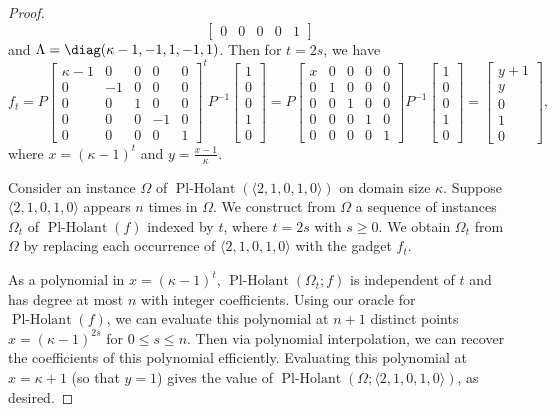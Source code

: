\documentclass[11pt]{article}
\newcommand{\PlHolant}{\operatorname{Pl-Holant}}
\begin{document}
\begin{proof}
\[\begin{bmatrix}
   0 &          0 & 0 &  0 & 1
  \end{bmatrix}
 \]
 and $\Lambda = \diag(\kappa - 1, -1, 1, -1, 1)$.
 Then for $t = 2 s$, we have
 \[
  f_t
  =
  P
  \begin{bmatrix}
   \kappa - 1 &  0 & 0 &  0 & 0 \\
            0 & -1 & 0 &  0 & 0 \\
            0 &  0 & 1 &  0 & 0 \\
            0 &  0 & 0 & -1 & 0 \\
            0 &  0 & 0 &  0 & 1
  \end{bmatrix}^t
  P^{-1}
  \begin{bmatrix}
   1 \\
   0 \\
   0 \\
   1 \\
   0
  \end{bmatrix}
  =
  P
  \begin{bmatrix}
   x & 0 & 0 & 0 & 0 \\
   0 & 1 & 0 & 0 & 0 \\
   0 & 0 & 1 & 0 & 0 \\
   0 & 0 & 0 & 1 & 0 \\
   0 & 0 & 0 & 0 & 1
  \end{bmatrix}
  P^{-1}
  \begin{bmatrix}
   1 \\
   0 \\
   0 \\
   1 \\
   0
  \end{bmatrix}
  =
  \begin{bmatrix}
   y+1 \\
   y \\
   0 \\
   1 \\
   0
  \end{bmatrix},
 \]
 where $x = (\kappa - 1)^t$ and $y = \frac{x-1}{\kappa}$.
 
 Consider an instance $\Omega$ of $\PlHolant(\langle 2,1,0,1,0 \rangle)$ on domain size $\kappa$.
 Suppose $\langle 2,1,0,1,0 \rangle$ appears $n$ times in $\Omega$.
 We construct from $\Omega$ a sequence of instances $\Omega_t$ of $\PlHolant(f)$ indexed by $t$,
 where $t = 2 s$ with $s \ge 0$.
 We obtain $\Omega_t$ from $\Omega$ by replacing each occurrence of $\langle 2,1,0,1,0 \rangle$ with the gadget $f_t$.
 
 As a polynomial in $x = (\kappa - 1)^t$, $\PlHolant(\Omega_t; f)$ is independent of $t$ and has degree at most $n$ with integer coefficients.
 Using our oracle for $\PlHolant(f)$,
 we can evaluate this polynomial at $n+1$ distinct points $x = (\kappa - 1)^{2s}$ for $0 \le s \le n$.
 Then via polynomial interpolation,
 we can recover the coefficients of this polynomial efficiently.
 Evaluating this polynomial at $x = \kappa + 1$ (so that $y = 1$) gives the value of $\PlHolant(\Omega; \langle 2,1,0,1,0 \rangle)$, as desired.
\end{proof}
\end{document}
